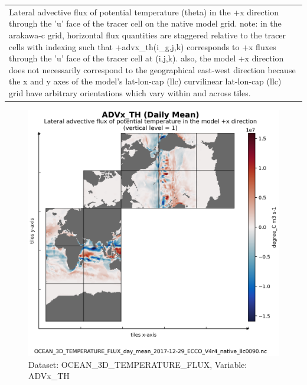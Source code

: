 \begin{longtable}{|m{}|m{}|m{}|m{}|}
\rowcolor{lightgray} \multicolumn{4}{|c|}{\textbf{Comments}} \\ \hline
\multicolumn{4}{|p{1\textwidth}|}{\footnotesize{{Lateral advective flux of potential temperature (theta) in the +x direction through the 'u' face of the tracer cell on the native model grid. note: in the arakawa-c grid, horizontal flux quantities are staggered relative to the tracer cells with indexing such that +advx\_th(i\_g,j,k) corresponds to +x fluxes through the 'u' face of the tracer cell at (i,j,k). also, the model +x direction does not necessarily correspond to the geographical east-west direction because the x and y axes of the model's lat-lon-cap (llc) curvilinear lat-lon-cap (llc) grid have arbitrary orientations which vary within and across tiles.}}} \\ \hline
\end{longtable}

\begin{figure}[H]
\centering
\includegraphics[scale=0.55]{../images/plots/v4r4/native_plots/Ocean_Three-Dimensional_Potential_Temperature_Fluxes/ADVx_TH.png}
\caption{Dataset: OCEAN\_3D\_TEMPERATURE\_FLUX, Variable: ADVx\_TH}
\label{tab:table-OCEAN_3D_TEMPERATURE_FLUX_ADVx_TH-Plot}
\end{figure}
\newpage
\pagebreak
